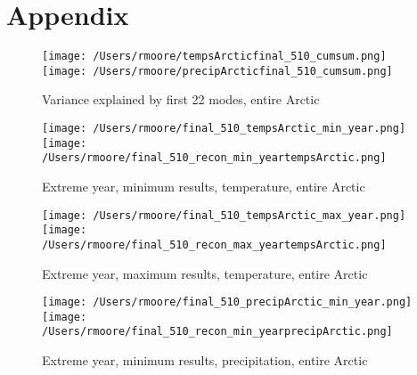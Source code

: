 \documentclass[11pt, oneside]{article}
\begin{document}
\newpage
\pagebreak
\newpage
\clearpage







\section{Appendix}

\begin{figure}[t!h]
    \centering
    \centering
      \texttt{[image: /Users/rmoore/tempsArcticfinal\_510\_cumsum.png]}
    \endminipage
    \centering
      \texttt{[image: /Users/rmoore/precipArcticfinal\_510\_cumsum.png]}
    \endminipage
    \caption{Variance explained by first 22 modes, entire Arctic}\label{PCA_cumsum_arctic}
    \end{figure}

\begin{figure}[b!h]
    \centering
    \texttt{[image: /Users/rmoore/final\_510\_tempsArctic\_min\_year.png]}
  \endminipage
  \\
      \texttt{[image: /Users/rmoore/final\_510\_recon\_min\_yeartempsArctic.png]}
    \endminipage 
    \caption{Extreme year, minimum results, temperature, entire Arctic}\label{min_temp_arctic}
\end{figure}

\begin{figure}[!htb]
    \centering
      \texttt{[image: /Users/rmoore/final\_510\_tempsArctic\_max\_year.png]}
    \endminipage
    \\
      \texttt{[image: /Users/rmoore/final\_510\_recon\_max\_yeartempsArctic.png]}
    \endminipage 
    \caption{Extreme year, maximum results, temperature, entire Arctic}\label{max_temp_arctic}
\end{figure}

    \begin{figure}[!htb]
        \centering
          \texttt{[image: /Users/rmoore/final\_510\_precipArctic\_min\_year.png]}
        \endminipage
    \\
    \texttt{[image: /Users/rmoore/final\_510\_recon\_min\_yearprecipArctic.png]}
  \endminipage 
        \caption{Extreme year, minimum results, precipitation, entire Arctic}\label{min_precip_arctic}
    \end{figure}
\end{document}
